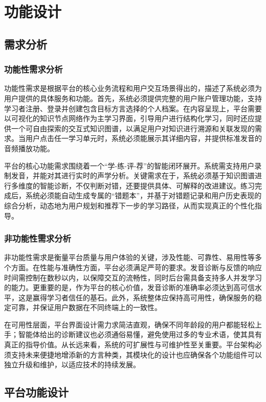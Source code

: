 
\chapter{功能设计}

\section{需求分析}
\subsection{功能性需求分析}
功能性需求是根据平台的核心业务流程和用户交互场景得出的，描述了系统必须为用户提供的具体服务和功能。首先，系统必须提供完整的用户账户管理功能，支持学习者注册、登录并创建包含目标方言选择的个人档案。在内容呈现上，平台需要以可视化的知识节点网络作为主学习界面，引导用户进行结构化学习，同时还应提供一个可自由探索的交互式知识图谱，以满足用户对知识进行溯源和关联发现的需求。当用户点击任一学习单元时，系统必须能展示其详细内容，并提供标准发音的音频播放功能。

平台的核心功能需求围绕着一个“学-练-评-荐”的智能闭环展开。系统需支持用户录制发音，并能对其进行实时的声学分析。关键需求在于，系统必须基于知识图谱进行多维度的智能诊断，不仅判断对错，还要提供具体、可解释的改进建议。练习完成后，系统必须能自动生成专属的“错题本”，并基于对错题记录和用户历史表现的综合分析，动态地为用户规划和推荐下一步的学习路径，从而实现真正的个性化指导。

\subsection{非功能性需求分析}
非功能性需求是衡量平台质量与用户体验的关键，涉及性能、可靠性、易用性等多个方面。在性能与准确性方面，平台必须满足严苛的要求。发音诊断与反馈的响应时间需控制在数秒以内，以保障交互的流畅性，同时后台需具备支持多人并发学习的能力。更重要的是，作为平台的核心价值，发音诊断的准确率必须达到高可信水平，这是赢得学习者信任的基石。此外，系统整体应保持高可用性，确保服务的稳定可靠，并保证用户数据在不同终端上的一致性。

在可用性层面，平台界面设计需力求简洁直观，确保不同年龄段的用户都能轻松上手；智能体给出的诊断建议也必须通俗易懂，避免使用过多的专业术语，使其具有真正的指导价值。从长远来看，系统的可扩展性与可维护性至关重要。平台架构必须支持未来便捷地增添新的方言种类，其模块化的设计也应确保各个功能组件可以独立升级和维护，以适应技术的持续发展。

\section{平台功能设计}

